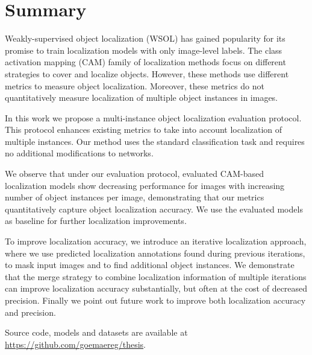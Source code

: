 \chapter*{Summary}

Weakly-supervised object localization (WSOL) has gained popularity for its promise to train localization models with only image-level labels. The class activation mapping (CAM) family of localization methods focus on different strategies to cover and localize objects. However, these methods use different metrics to measure object localization. Moreover, these metrics do not quantitatively measure localization of multiple object instances in images.

In this work we propose a multi-instance object localization evaluation protocol. This protocol enhances existing metrics to take into account localization of multiple instances. Our method uses the standard classification task and requires no additional modifications to networks.

We observe that under our evaluation protocol, evaluated CAM-based localization models show decreasing performance for images with increasing number of object instances per image, demonstrating that our metrics quantitatively capture object localization accuracy. We use the evaluated models as baseline for further localization improvements.

To improve localization accuracy, we introduce an iterative localization approach, where we use predicted localization annotations found during previous iterations, to mask input images and to find additional object instances. We demonstrate that the merge strategy to combine localization information of multiple iterations can improve localization accuracy substantially, but often at the cost of decreased precision. Finally we point out future work to improve both localization accuracy and precision.

Source code, models and datasets are available at \url{https://github.com/goemaereg/thesis}.
